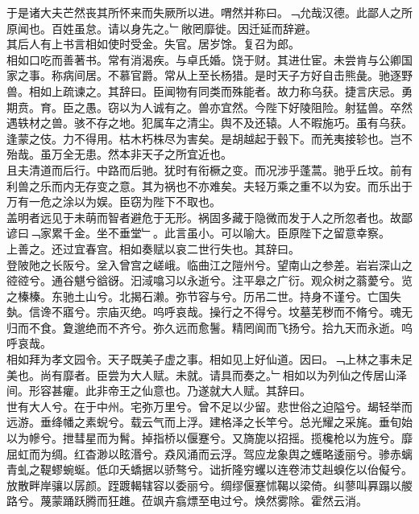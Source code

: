 \documentclass{zhvt-classic}
\begin{document}
\hspace*{2em}于是诸大夫芒然丧其所怀来而失厥所以进。喟然并称曰。﹁允哉汉德。此鄙人之所原闻也。百姓虽怠。请以身先之。﹂敞罔靡徙。因迁延而辞避。\\
\hspace*{2em}其后人有上书言相如使时受金。失官。居岁馀。复召为郎。\\
\hspace*{2em}相如口吃而善著书。常有消渴疾。与卓氏婚。饶于财。其进仕宦。未尝肯与公卿国家之事。称病间居。不慕官爵。常从上至长杨猎。是时天子方好自击熊彘。驰逐野兽。相如上疏谏之。其辞曰。臣闻物有同类而殊能者。故力称乌获。捷言庆忌。勇期贲。育。臣之愚。窃以为人诚有之。兽亦宜然。今陛下好陵阻险。射猛兽。卒然遇轶材之兽。骇不存之地。犯属车之清尘。舆不及还辕。人不暇施巧。虽有乌获。逢蒙之伎。力不得用。枯木朽株尽为害矣。是胡越起于毂下。而羌夷接轸也。岂不殆哉。虽万全无患。然本非天子之所宜近也。\\
\hspace*{2em}且夫清道而后行。中路而后驰。犹时有衔橛之变。而况涉乎蓬蒿。驰乎丘坟。前有利兽之乐而内无存变之意。其为祸也不亦难矣。夫轻万乘之重不以为安。而乐出于万有一危之涂以为娱。臣窃为陛下不取也。\\
\hspace*{2em}盖明者远见于未萌而智者避危于无形。祸固多藏于隐微而发于人之所忽者也。故鄙谚曰﹁家累千金。坐不垂堂﹂。此言虽小。可以喻大。臣原陛下之留意幸察。\\
\hspace*{2em}上善之。还过宜春宫。相如奏赋以哀二世行失也。其辞曰。\\
\hspace*{2em}登陂阤之长阪兮。坌入曾宫之嵯峨。临曲江之隑州兮。望南山之参差。岩岩深山之谾谾兮。通谷魌兮谽谺。汩淢噏习以永逝兮。注平皋之广衍。观众树之蓊薆兮。览之榛榛。东驰土山兮。北揭石濑。弥节容与兮。历吊二世。持身不谨兮。亡国失埶。信谗不寤兮。宗庙灭绝。呜呼哀哉。操行之不得兮。坟墓芜秽而不脩兮。魂无归而不食。夐邈绝而不齐兮。弥久远而愈鬐。精罔阆而飞扬兮。拾九天而永逝。呜呼哀哉。\\
\hspace*{2em}相如拜为孝文园令。天子既美子虚之事。相如见上好仙道。因曰。﹁上林之事未足美也。尚有靡者。臣尝为大人赋。未就。请具而奏之。﹂相如以为列仙之传居山泽间。形容甚癯。此非帝王之仙意也。乃遂就大人赋。其辞曰。\\
\hspace*{2em}世有大人兮。在于中州。宅弥万里兮。曾不足以少留。悲世俗之迫隘兮。朅轻举而远游。垂绛幡之素蜺兮。载云气而上浮。建格泽之长竿兮。总光耀之采旄。垂旬始以为幓兮。抴彗星而为髾。掉指桥以偃蹇兮。又旖旎以招摇。揽欃枪以为旌兮。靡屈虹而为绸。红杳渺以眩湣兮。猋风涌而云浮。驾应龙象舆之蠖略逶丽兮。骖赤螭青虬之鞮蟉蜿蜒。低卬夭蟜据以骄骜兮。诎折隆穷蠼以连卷沛艾赳螑仡以佁儗兮。放散畔岸骧以孱颜。跮踱輵辖容以委丽兮。绸缪偃蹇怵鞨以梁倚。纠蓼叫奡蹋以艐路兮。蔑蒙踊跃腾而狂趡。莅飒卉翕熛至电过兮。焕然雾除。霍然云消。\\
\end{document}
